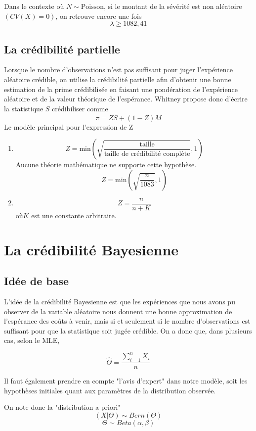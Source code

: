 Dans le contexte où $N \sim \text{Poisson}$, si le montant de la sévérité est non aléatoire $(CV(X)=0)$, on retrouve encore une fois
$$\lambda \ge 1082,41$$

\subsection{La crédibilité partielle}

Lorsque le nombre d'observations n'est pas suffisant pour juger l'expérience aléatoire crédible, on utilise la crédibilité partielle afin d'obtenir une bonne estimation de la prime crédibilisée en faisant une pondération de l'expérience aléatoire et de la valeur théorique de l'espérance. Whitney propose donc d'écrire la statistique $S$ crédibiliser comme 
$$\pi = Z \overline{S}+(1-Z)M$$
Le modèle principal pour l'expression de Z
\begin{enumerate}
\item $$Z= \text{min} \left(\sqrt{\frac{\text{taille}}{\text{taille de crédibilité complète}}},1 \right)$$
    Aucune théorie mathématique ne supporte cette hypothèse.
    $$Z=\text{min} \left(\sqrt{\frac{n}{1083}},1 \right)$$

\item $$Z=\frac{n}{n+K}$$
  où$K$ est une constante arbitraire.
\end{enumerate}


\section{La crédibilité Bayesienne } 

\subsection{Idée de base}

L'idée de la crédibilité Bayesienne est que les expériences que nous avons pu observer de la variable aléatoire nous donnent une bonne approximation de l'espérance des coûts à venir, mais si et seulement si le nombre d'observations est suffisant pour que la statistique soit jugée crédible. On a donc que, dans plusieurs cas, selon le MLE, 

$$\widehat{\Theta} = \frac{\sum_{i=1}^{n} X_i}{n}$$

Il faut également prendre en compte "l'avis d'expert" dans notre modèle, soit les hypothèses initiales quant aux paramètres de la distribution observée.

On note donc la "distribution a priori"
$$(X|\Theta) \sim Bern(\Theta)$$
$$\Theta \sim Beta(\alpha, \beta)$$

